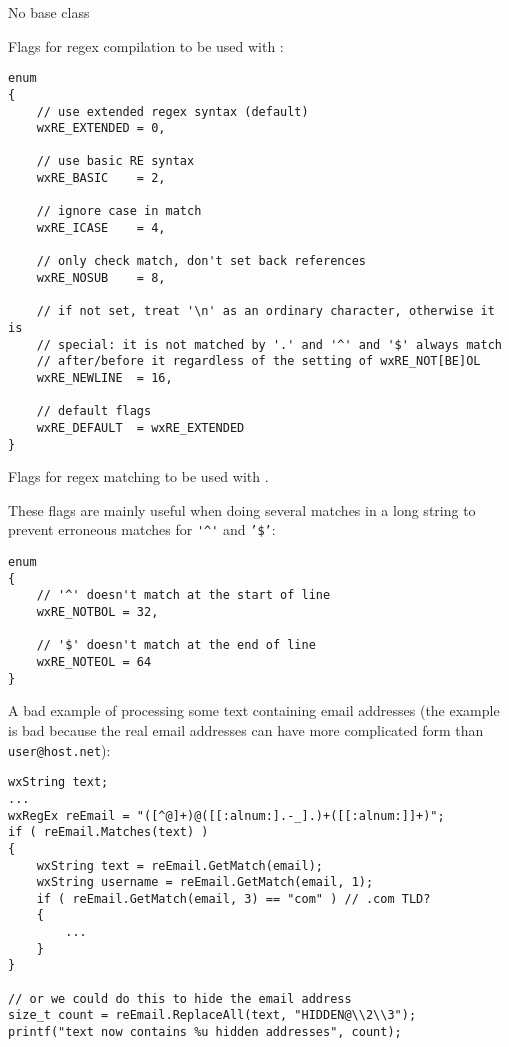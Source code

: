
No base class


Flags for regex compilation to be used with :

\begin{verbatim}
enum
{
    // use extended regex syntax (default)
    wxRE_EXTENDED = 0,

    // use basic RE syntax
    wxRE_BASIC    = 2,

    // ignore case in match
    wxRE_ICASE    = 4,

    // only check match, don't set back references
    wxRE_NOSUB    = 8,

    // if not set, treat '\n' as an ordinary character, otherwise it is
    // special: it is not matched by '.' and '^' and '$' always match
    // after/before it regardless of the setting of wxRE_NOT[BE]OL
    wxRE_NEWLINE  = 16,

    // default flags
    wxRE_DEFAULT  = wxRE_EXTENDED
}
\end{verbatim}

Flags for regex matching to be used with .

These flags are mainly useful when doing several matches in a long string
to prevent erroneous matches for \verb|'^'| and {\tt '\$'}:

\begin{verbatim}
enum
{
    // '^' doesn't match at the start of line
    wxRE_NOTBOL = 32,

    // '$' doesn't match at the end of line
    wxRE_NOTEOL = 64
}
\end{verbatim}


A bad example of processing some text containing email addresses (the example
is bad because the real email addresses can have more complicated form than
{\tt user@host.net}):

\begin{verbatim}
wxString text;
...
wxRegEx reEmail = "([^@]+)@([[:alnum:].-_].)+([[:alnum:]]+)";
if ( reEmail.Matches(text) )
{
    wxString text = reEmail.GetMatch(email);
    wxString username = reEmail.GetMatch(email, 1);
    if ( reEmail.GetMatch(email, 3) == "com" ) // .com TLD?
    {
        ...
    }
}

// or we could do this to hide the email address
size_t count = reEmail.ReplaceAll(text, "HIDDEN@\\2\\3");
printf("text now contains %u hidden addresses", count);
\end{verbatim}

